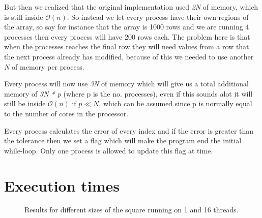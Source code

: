 \documentclass[titlepage, a4paper]{article}
\begin{document}
But then we realized that the original implementation used \textit{2N} of memory, which is still inside $\mathcal{O}(n)$. So instead we let every process have their own regions of the array, so say for instance that the array is 1000 rows and we are running 4 processes then every process will have 200 rows each. The problem here is that when the processes reaches the final row they will need values from a row that the next process already has modified, because of this we needed to use another \textit{N} of memory per process.

Every process will now use \textit{3N} of memory which will give us a total additional memory of \textit{3N * p} (where p is the no. processes), even if this sounds alot it will still be inside $\mathcal{O}(n)$ if $p \ll N$, which can be assumed since p is normally equal to the number of cores in the processor.

Every process calculates the error of every index and if the error is greater than the tolerance then we set a flag which will make the program end the initial while-loop. Only one process is allowed to update this flag at time.

\section{Execution times}


\begin{figure}[H]
  \centering
  \caption{Results for different sizes of the square running on 1 and 16 threads.}
  \label{fig:results}
\end{figure}
\end{document}
